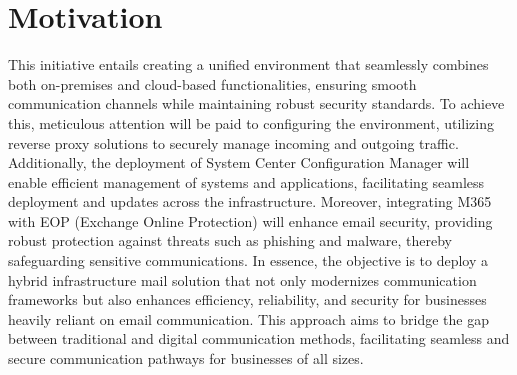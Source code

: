\section{Motivation}
This initiative entails creating a unified environment that seamlessly combines both on-premises and cloud-based functionalities, ensuring smooth communication channels while maintaining robust security standards. To achieve this, meticulous attention will be paid to configuring the environment, utilizing reverse proxy solutions to securely manage incoming and outgoing traffic. Additionally, the deployment of System Center Configuration Manager will enable efficient management of systems and applications, facilitating seamless deployment and updates across the infrastructure.
Moreover, integrating M365 with EOP (Exchange Online Protection) will enhance email security, providing robust protection against threats such as phishing and malware, thereby safeguarding sensitive communications.
In essence, the objective is to deploy a hybrid infrastructure mail solution that not only modernizes communication frameworks but also enhances efficiency, reliability, and security for businesses heavily reliant on email communication. This approach aims to bridge the gap between traditional and digital communication methods, facilitating seamless and secure communication pathways for businesses of all sizes.

